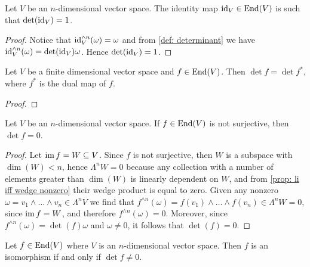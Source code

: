 \begin{proposition}\label{prop: id det}
Let \(V\) be an \(n\)-dimensional vector space. The identity map \(\operatorname{id}_V \in
\operatorname{End}(V)\) is such that \(\det(\operatorname{id}_V) = 1\).
\end{proposition}

\begin{proof}
Notice that \(\operatorname{id}_V^{\wedge n}(\omega) = \omega\) and from \cref{def:
determinant} we have \(\operatorname{id}_V^{\wedge n}(\omega) = \det(\operatorname{id}_V) \omega\). Hence
\(\det(\operatorname{id}_V) = 1\).
\end{proof}

\begin{proposition}
Let \(V\) be a finite dimensional vector space and \(f \in \operatorname{End}(V)\). Then
\(\det f = \det f^*\), where \(f^*\) is the dual map of \(f\).
\end{proposition}

\begin{proof}

\end{proof}



\begin{lemma}\label{lem: not surjective 0 det}
Let \(V\) be an \(n\)-dimensional vector space. If \(f \in \operatorname{End}(V)\) is not
surjective, then \(\det f = 0\).
\end{lemma}

\begin{proof}
Let \(\operatorname{im} f = W \subseteq V\). Since \(f\) is not surjective, then \(W\) is a
subspace with \(\dim(W) < n\), hence \(\Lambda^n W = 0\) because any
collection with a number of elements greater than \(\dim(W)\) is linearly
dependent on \(W\), and from \cref{prop: li iff wedge nonzero} their wedge
product is equal to zero. Given any nonzero \(\omega = v_1 \wedge \dots \wedge
v_n \in \Lambda^n V\) we find that \(f^{\wedge n}(\omega) = f(v_1) \wedge
\dots \wedge f(v_n) \in \Lambda^n W = 0\), since \(\operatorname{im} f = W\), and therefore
\(f^{\wedge n}(\omega) = 0\). Moreover, since \(f^{\wedge n}(\omega) = \det(f)
\omega\) and \(\omega \neq 0\), it follows that \(\det(f) = 0\).
\end{proof}

\begin{proposition}
\label{prop: iso det}
Let \(f \in \operatorname{End}(V)\) where \(V\) is an \(n\)-dimensional vector space. Then
\(f\) is an isomorphism if and only if \(\det f \neq 0\).
\end{proposition}

